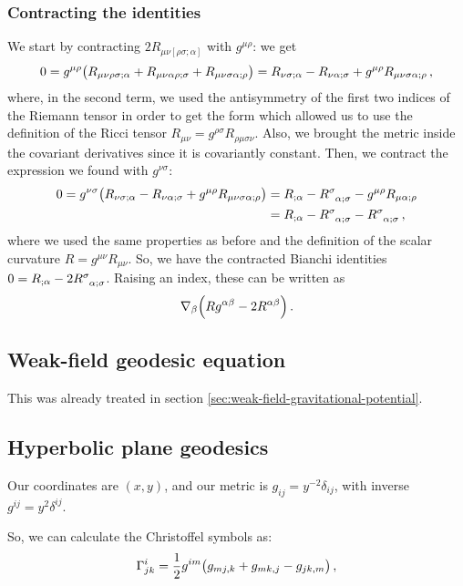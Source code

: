 \documentclass[main.tex]{subfiles}
\begin{document}
\subsubsection{Contracting the identities}

We start by contracting \(2 R_{\mu \nu [ \rho \sigma ; \alpha ]}\) with \(g^{\mu \rho }\): we get 
%
\begin{align}
    0=
  g^{\mu \rho } \qty(R_{\mu \nu \rho \sigma ; \alpha } + R_{\mu \nu \alpha \rho ; \sigma } + R_{\mu \nu \sigma \alpha ; \rho }) = R_{\nu \sigma ; \alpha } - R_{\nu \alpha ; \sigma } + g^{\mu \rho } R_{\mu \nu \sigma \alpha ; \rho }
\,,
\end{align}
%
where, in the second term, we used the antisymmetry of the first two indices of the Riemann tensor in order to get the form which allowed us to use the definition of the Ricci tensor \(R_{\mu \nu } = g^{\rho \sigma } R_{\rho \mu \sigma \nu }\).
Also, we brought the metric inside the covariant derivatives since it is covariantly constant.
Then, we contract the expression we found with \(g^{\nu \sigma }\): 
%
\begin{align} 
  0=
  g^{\nu \sigma } \qty(R_{\nu \sigma ; \alpha } - R_{\nu \alpha ; \sigma } + g^{\mu \rho } R_{\mu \nu \sigma \alpha ; \rho })
  &= R_{;\alpha  } - \tensor{R}{^{\sigma }_{\alpha; \sigma  }} - g^{\mu \rho} R_{\mu \alpha ; \rho }  \\
  &= R_{;\alpha  } - \tensor{R}{^{\sigma }_{\alpha; \sigma  }} - \tensor{R}{^{\sigma }_{\alpha ; \sigma }}
\,,
\end{align}
%
where we used the same properties as before and the definition of the scalar curvature \(R = g^{\mu \nu }R_{\mu \nu }\). So, we have the contracted Bianchi identities \(0 = R_{;\alpha } - 2 \tensor{R}{^{\sigma }_{\alpha ; \sigma }}\).
Raising an index, these can be written as 
%
\begin{align}
  \nabla_{\beta } \qty(R g^{\alpha \beta } - 2R^{\alpha \beta })
\,.
\end{align}
%

\subsection{Weak-field geodesic equation}

This was already treated in section \ref{sec:weak-field-gravitational-potential}.

\subsection{Hyperbolic plane geodesics}

Our coordinates are \((x, y)\), and our metric is \(g_{ij } = y^{-2} \delta_{ij }\), with inverse \(g^{ij} = y^2 \delta^{ij}\).

So, we can calculate the Christoffel symbols as: 
%
\begin{align}
  \Gamma^{i}_{jk} = \frac{1}{2} g^{im} \qty(g_{mj,k} + g_{m k, j } - g_{jk,m})
\,,
\end{align}
%
\end{document}
